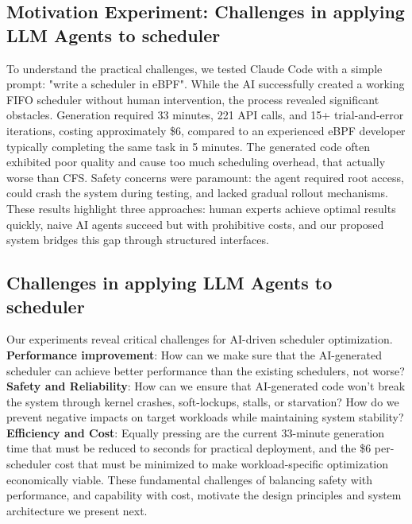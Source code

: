 \subsection{Motivation Experiment: Challenges in applying LLM Agents to scheduler}

To understand the practical challenges, we tested Claude Code with a simple prompt: "write a scheduler in eBPF". While the AI successfully created a working FIFO scheduler without human intervention, the process revealed significant obstacles. Generation required 33 minutes, 221 API calls, and 15+ trial-and-error iterations, costing approximately \$6, compared to an experienced eBPF developer typically completing the same task in 5 minutes. The generated code often exhibited poor quality and cause too much scheduling overhead, that actually worse than CFS. Safety concerns were paramount: the agent required root access, could crash the system during testing, and lacked gradual rollout mechanisms. These results highlight three approaches: human experts achieve optimal results quickly, naive AI agents succeed but with prohibitive costs, and our proposed system bridges this gap through structured interfaces.

\subsection{Challenges in applying LLM Agents to scheduler}

Our experiments reveal critical challenges for AI-driven scheduler optimization. \textbf{Performance improvement}: How can we make sure that the AI-generated scheduler can achieve better performance than the existing schedulers, not worse? \textbf{Safety and Reliability}: How can we ensure that AI-generated code won't break the system through kernel crashes, soft-lockups, stalls, or starvation? How do we prevent negative impacts on target workloads while maintaining system stability? \textbf{Efficiency and Cost}: Equally pressing are the current 33-minute generation time that must be reduced to seconds for practical deployment, and the \$6 per-scheduler cost that must be minimized to make workload-specific optimization economically viable. These fundamental challenges of balancing safety with performance, and capability with cost, motivate the design principles and system architecture we present next.